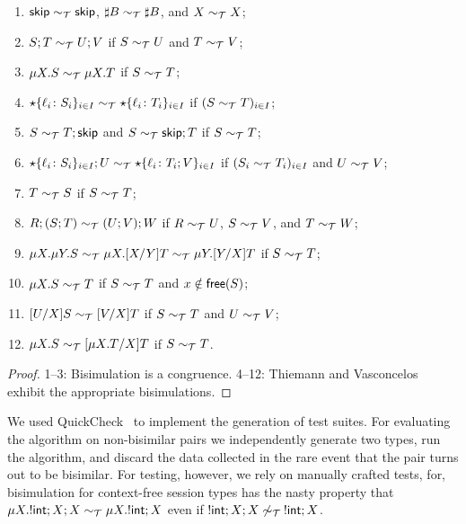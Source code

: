 \begin{theorem}
\label{thm:properties_quickcheck}
  \begin{enumerate}
  \item $\mathsf{skip} \sim_\mathcal T \mathsf{skip}$,  $\sharp B \sim_\mathcal T \sharp B$, and
    $X \sim_\mathcal T X$;
  \item $S;T \sim_\mathcal T U;V$ if $S \sim_\mathcal T U$ and $T \sim_\mathcal T V$; 
  \item $\mu X.S \sim_\mathcal T \mu X.T$ if $S \sim_\mathcal T T$; 
  \item $\star\{\ell_i\colon S_i\}_{i\in I}\sim_\mathcal T
    \star\{\ell_i\colon T_i\}_{i\in I}$ if $(S \sim_\mathcal T T)_{i\in
      I}$;
  \item $S\sim_\mathcal T T;\mathsf{skip}$ and $S\sim_\mathcal T \mathsf{skip};T$ if $S \sim_\mathcal T T$;
  \item $\star\{\ell_i\colon S_i\}_{i\in I};U\sim_\mathcal T
    \star\{\ell_i\colon T_i;V\}_{i\in I}$ if $(S_i \sim_\mathcal T T_i)_{i\in
      I}$ and $U \sim_\mathcal T V$;
  \item $T \sim_\mathcal T S$ if $S \sim_\mathcal T T$;
  \item $R;(S;T) \sim_\mathcal T (U;V);W$ if $R \sim_\mathcal T U$, $S \sim_\mathcal T V$, and $T\sim_\mathcal T W$;
  \item
    $\mu X.\mu Y.S \sim_\mathcal T \mu X.[{X}/{Y}]T \sim_\mathcal T \mu Y.[{Y}/{X}]T$ if $S \sim_\mathcal T T$;
  \item $\mu X.S \sim_\mathcal T T$ if $S \sim_\mathcal T T$ and $x\notin\mathsf{free}(S)$;
  \item $[{U}/{X}]S\sim_\mathcal T [{V}/{X}]T$  if $S \sim_\mathcal T T$ and $U \sim_\mathcal T V$; 
  \item $\mu X.S \sim_\mathcal T [{\mu X.T}/{X}]T$ if $S \sim_\mathcal T T$.
  \end{enumerate}
\end{theorem}
%
\begin{proof}
  1--3: Bisimulation is a congruence. 4--12: Thiemann and
  Vasconcelos~\cite{thiemann2016context} exhibit the appropriate
  bisimulations.
\end{proof}

We used QuickCheck~\cite{DBLP:conf/icfp/ClaessenH00} to implement the
generation of test suites. For evaluating the algorithm on
non-bisimilar pairs we independently generate two types, run the
algorithm, and discard the data collected in the rare event that the
pair turns out to be bisimilar.
%
For testing, however, we rely on manually crafted tests, for,
bisimulation for context-free session types has the nasty property
that $\mu X. !\mathsf{int};X;X \sim_\mathcal T \mu X. !\mathsf{int};X$ even if
$!\mathsf{int};X;X \not\sim_\mathcal T\: !\mathsf{int};X$.


